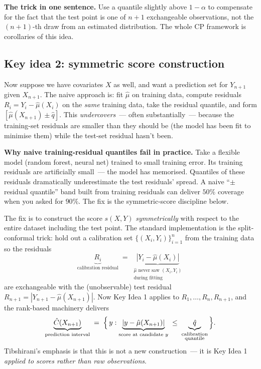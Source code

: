 \documentclass[letterpaper,11pt,leqno]{article}
\begin{document}
\begin{explain}
\textbf{The trick in one sentence.} Use a quantile slightly above $1-\alpha$ to compensate for the fact that the test point is one of $n+1$ exchangeable observations, not the $(n+1)$-th draw from an estimated distribution. The whole CP framework is corollaries of this idea.
\end{explain}

\subsection*{Key idea 2: symmetric score construction}

Now suppose we have covariates $X$ as well, and want a prediction set for $Y_{n+1}$ given $X_{n+1}$. The naive approach is: fit $\hat{\mu}$ on training data, compute residuals $R_i = Y_i - \hat{\mu}(X_i)$ on the \emph{same} training data, take the residual quantile, and form $[\hat{\mu}(X_{n+1}) \pm \hat{q}]$. This \emph{undercovers}~--- often substantially~--- because the training-set residuals are smaller than they should be (the model has been fit to minimise them) while the test-set residual hasn't been.

\begin{whymatters}
\textbf{Why naive training-residual quantiles fail in practice.} Take a flexible model (random forest, neural net) trained to small training error. Its training residuals are artificially small~--- the model has memorised. Quantiles of these residuals dramatically underestimate the test residuals' spread. A naive ``$\pm$ residual quantile'' band built from training residuals can deliver $50\%$ coverage when you asked for $90\%$. The fix is the symmetric-score discipline below.
\end{whymatters}

The fix is to construct the score $s(X, Y)$ \emph{symmetrically} with respect to the entire dataset including the test point. The standard implementation is the split-conformal trick: hold out a calibration set $\{(X_i, Y_i)\}_{i=1}^n$ from the training data so the residuals
\begin{equation*}
\underbrace{R_i}_{\text{calibration residual}}
\;=\;
\underbrace{|Y_i - \hat{\mu}(X_i)|}_{\substack{\hat{\mu}\text{ never saw }(X_i, Y_i)\\\text{during fitting}}}
\end{equation*}
are exchangeable with the (unobservable) test residual $R_{n+1} = |Y_{n+1} - \hat{\mu}(X_{n+1})|$. Now Key Idea 1 applies to $R_1, \dots, R_n, R_{n+1}$, and the rank-based machinery delivers
\begin{equation*}
\underbrace{\hat{C}(X_{n+1})}_{\substack{\text{prediction interval}}}
\;=\;
\Bigl\{\,y :
\underbrace{|y - \hat{\mu}(X_{n+1})|}_{\text{score at candidate }y}
\;\leq\;
\underbrace{\hat{q}}_{\substack{\text{calibration}\\\text{quantile}}}
\,\Bigr\}.
\end{equation*}
Tibshirani's emphasis is that this is not a new construction~--- it is Key Idea 1 \emph{applied to scores rather than raw observations}.
\end{document}
